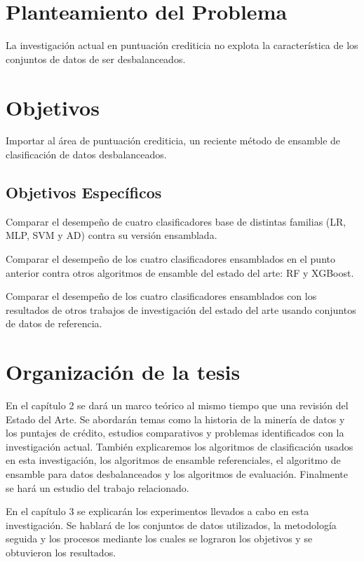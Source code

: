 \section{Planteamiento del Problema}

La investigación actual en puntuación crediticia no explota la característica de los conjuntos de datos de ser desbalanceados.

\section{Objetivos}

Importar al área de puntuación crediticia, un reciente método de ensamble de clasificación de datos desbalanceados.

\subsection{Objetivos Específicos}

Comparar el desempeño de cuatro clasificadores base de distintas familias (\ac{LR}, \ac{MLP}, \ac{SVM} y \ac{AD}) contra su versión ensamblada.

Comparar el desempeño de los cuatro clasificadores ensamblados en el punto anterior contra otros algoritmos de ensamble del estado del arte: \ac{RF} y \ac{XGBoost}.

Comparar el desempeño de los cuatro clasificadores ensamblados con los resultados de otros trabajos de investigación del estado del arte usando conjuntos de datos de referencia.

\section{Organización de la tesis}

En el capítulo 2 se dará un marco teórico al mismo tiempo que una revisión del Estado del Arte. Se abordarán temas como la historia de la minería de datos y los puntajes de crédito, estudios comparativos y problemas identificados con la investigación actual. También explicaremos los algoritmos de clasificación usados en esta investigación, los algoritmos de ensamble referenciales, el algoritmo de ensamble para datos desbalanceados y los algoritmos de evaluación. Finalmente se hará un estudio del trabajo relacionado.

En el capítulo 3 se explicarán los experimentos llevados a cabo en esta investigación. Se hablará de los conjuntos de datos utilizados, la metodología seguida y los procesos mediante los cuales se lograron los objetivos y se obtuvieron los resultados.

